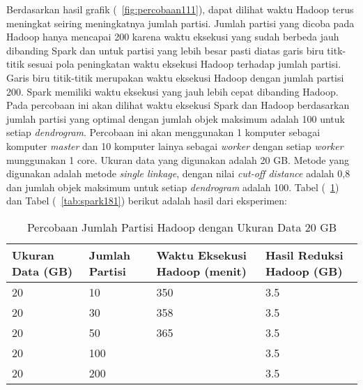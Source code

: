 Berdasarkan hasil grafik (~\ref{fig:percobaan111}), dapat dilihat waktu Hadoop terus meningkat seiring meningkatnya jumlah partisi. Jumlah partisi yang dicoba pada Hadoop hanya mencapai 200 karena waktu eksekusi yang sudah berbeda jauh dibanding Spark dan untuk partisi yang lebih besar pasti diatas garis biru titk-titik sesuai pola peningkatan waktu eksekusi Hadoop terhadap jumlah partisi. Garis biru titik-titik merupakan waktu eksekusi Hadoop dengan jumlah partisi 200. Spark memiliki waktu eksekusi yang jauh lebih cepat dibanding Hadoop. \\




Pada percobaan ini akan dilihat waktu eksekusi Spark dan Hadoop berdasarkan jumlah partisi yang optimal dengan jumlah objek maksimum adalah 100 untuk setiap \textit{dendrogram}. Percobaan ini akan menggunakan 1 komputer sebagai komputer \textit{master} dan 10 komputer lainya sebagai \textit{worker} dengan setiap \textit{worker} munggunakan 1 core. Ukuran data yang digunakan adalah 20 GB. Metode yang digunakan adalah metode \textit{single linkage}, dengan nilai \textit{cut-off distance} adalah 0,8 dan jumlah objek maksimum untuk setiap \textit{dendrogram} adalah 100. Tabel (~\ref{tab:spark171}) dan Tabel (~\ref{tab:spark181}) berikut adalah hasil dari eksperimen:





\begin{table}[H] 
	\centering 
	\caption{Percobaan Jumlah Partisi Hadoop dengan Ukuran Data 20 GB}
	\label{tab:spark171}
	\begin{tabular}{|p{3cm}|p{3cm}|p{4cm}|p{4cm}|}
\hline
Ukuran Data (GB) & Jumlah Partisi &  Waktu Eksekusi Hadoop (menit) & Hasil Reduksi Hadoop (GB)\\
\hline
20 & 10 & 350  & 3.5  \\
\hline
20 & 30 & 358  & 3.5  \\
\hline
20 & 50 & 365  & 3.5  \\
\hline
20 & 100 &   & 3.5  \\
\hline
20 & 200 &   & 3.5  \\
\hline


\hline

	\end{tabular} 
\end{table}




